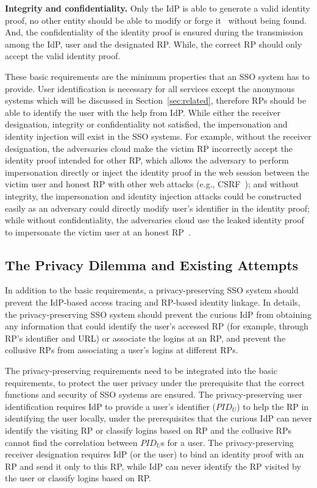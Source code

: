 \vspace{1mm}\noindent\textbf{Integrity and confidentiality.} Only the IdP is able to generate a valid identity proof,
     no other entity should be able to modify or forge it~\cite{WangZLG16} without being found. And, the confidentiality of the identity proof is ensured during the transmission among the IdP, user and the designated RP. While, the correct RP should only accept the valid identity proof.


These basic requirements are the minimum properties that an SSO system has to provide.
User identification is necessary for all services except the anonymous systems which will be discussed in Section~\ref{sec:related},
 therefore RPs should be able to identify the user with the help from IdP.
While either the receiver designation, integrity or confidentiality not satisfied, the impersonation and identity injection will exist in the SSO systems.
For example, without the receiver designation, the adversaries cloud make the victim RP  incorrectly accept the identity proof intended for other RP, which allows the adversary to perform impersonation directly or inject the identity proof in the web session between the victim user and honest RP with other web attacks (e.g., CSRF~\cite{zeller2008cross}); and without integrity, the impersonation and identity injection attacks could be constructed easily  as an adversary could directly modify user's identifier in the identity proof; while without confidentiality, the adversaries cloud use the leaked identity proof to impersonate the victim user at an honest RP~\cite{ChenPCTKT14,FettKS16,WangZLG16}.



\subsection{The Privacy Dilemma and Existing Attempts}
\label{subsec:challenges}
In addition to the basic requirements, a privacy-preserving SSO system should prevent the IdP-based access tracing %
and RP-based identity linkage.
In details, the privacy-preserving SSO system should prevent the curious IdP from obtaining any information that could identify the user's accessed RP (for example, through RP's identifier and URL) or associate the logins at an RP,
and prevent  the collusive RPs from associating a user's logins at different RPs.

The privacy-preserving requirements need to be integrated into the basic requirements, to protect the user privacy under the prerequisite that the correct functions and security of SSO systems are ensured.
The privacy-preserving user identification requires IdP to provide a user's identifier ($PID_U$) to help the RP in identifying the user locally,
 under the prerequisites that the curious IdP can never identify the visiting RP or classify logins based on RP and the collusive RPs cannot find the correlation between $PID_U$s for a user.
The privacy-preserving receiver designation requires IdP (or the user) to bind an identity proof with an RP and send it only to this RP,
 while IdP can never identify the RP visited by the user or classify logins based on RP.

